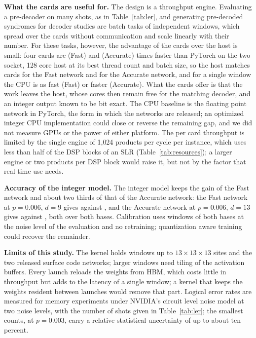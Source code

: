 \textbf{What the cards are useful for.} The design is a throughput engine. Evaluating a pre-decoder on many shots, as
in Table~\ref{tab:ler}, and generating pre-decoded syndromes for decoder studies are batch tasks of independent windows,
which spread over the cards without communication and scale linearly with their number. For these tasks, however,
the advantage of the cards over the host is small: four cards are \NumSpeedFast{} (Fast) and \NumSpeedAcc{}
(Accurate) times faster than PyTorch on the two socket, 128 core host at its best thread count and batch size, so the
host matches \NumHostCardsFast{} cards for the Fast network and \NumHostCardsAcc{} for the Accurate network, and for a single window the CPU is as fast (Fast) or faster (Accurate). What the cards
offer is that the work leaves the host, whose cores then remain free for the matching decoder, and an integer output
known to be bit exact. The CPU baseline is the floating point network in PyTorch, the form in which the networks are
released; an optimized integer CPU implementation could close or reverse the remaining gap, and we did not measure GPUs
or the power of either platform. The per card throughput is limited by the single engine of 1{,}024 products per cycle
per instance, which uses less than half of the DSP blocks of an SLR (Table~\ref{tab:resources}); a larger engine or
two products per DSP block would raise it, but not by the factor that real time use needs.

\textbf{Accuracy of the integer model.} The integer model keeps the gain of the Fast network and about two thirds of
that of the Accurate network: the Fast network at $p=0.006$, $d=9$ gives \NumRatioFastIntNineHigh{} against \NumRatioFastFpNineHigh{}, and the Accurate
network at $p=0.006$, $d=13$ gives \NumRatioAccIntThirteenHigh{} against \NumRatioAccFpThirteenHigh{}, both over both
bases. Calibration uses windows of both bases at the noise level of the evaluation and no retraining; quantization aware
training could recover the remainder.

\textbf{Limits of this study.} The kernel holds windows up to $13\times13\times13$ sites and the two released surface
code networks; larger windows need tiling of the activation buffers. Every launch reloads the weights from HBM, which
costs little in throughput but adds to the latency of a single window; a kernel that keeps the weights resident between
launches would remove that part. Logical error rates are measured for memory experiments under NVIDIA's circuit level
noise model at two noise levels, with the number of shots given in Table~\ref{tab:ler}; the smallest counts, at
$p=0.003$, carry a relative statistical uncertainty of up to about ten percent.
